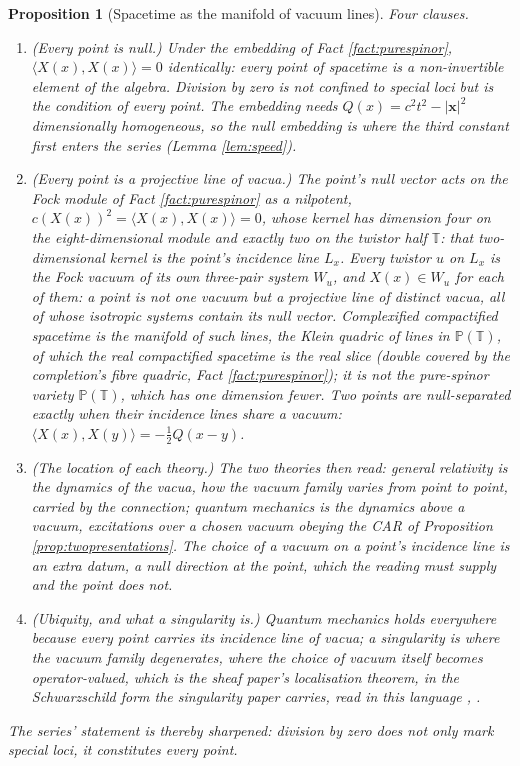 \documentclass[11pt]{article}
\newtheorem{proposition}[theorem]{Proposition}
\theoremstyle{definition}
\newcommand{\T}{\mathbb{T}}
\newcommand{\ip}[2]{\langle #1, #2\rangle}
\begin{document}
\begin{proposition}[Spacetime as the manifold of vacuum lines]\label{prop:vacuummanifold}
Four clauses.
\begin{enumerate}
\item \emph{(Every point is null.)} Under the embedding of Fact \ref{fact:purespinor}, $\ip{X(x)}{X(x)} = 0$ identically: every point of spacetime is a non-invertible element of the algebra. Division by zero is not confined to special loci but is the condition of every point. The embedding needs $Q(x) = c^{2}t^{2} - |\mathbf{x}|^{2}$ dimensionally homogeneous, so the null embedding is where the third constant first enters the series (Lemma \ref{lem:speed}).
\item \emph{(Every point is a projective line of vacua.)} The point's null vector acts on the Fock module of Fact \ref{fact:purespinor} as a nilpotent, $c(X(x))^{2} = \ip{X(x)}{X(x)} = 0$, whose kernel has dimension four on the eight-dimensional module and exactly two on the twistor half $\T$: that two-dimensional kernel is the point's incidence line $L_{x}$. Every twistor $u$ on $L_{x}$ is the Fock vacuum of its own three-pair system $W_{u}$, and $X(x) \in W_{u}$ for each of them: a point is not one vacuum but a projective line of distinct vacua, all of whose isotropic systems contain its null vector. Complexified compactified spacetime is the manifold of such lines, the Klein quadric of lines in $\mathbb{P}(\T)$, of which the real compactified spacetime is the real slice (double covered by the completion's fibre quadric, Fact \ref{fact:purespinor}); it is not the pure-spinor variety $\mathbb{P}(\T)$, which has one dimension fewer. Two points are null-separated exactly when their incidence lines share a vacuum: $\ip{X(x)}{X(y)} = -\tfrac12 Q(x - y)$.
\item \emph{(The location of each theory.)} The two theories then read: general relativity is the dynamics \emph{of} the vacua, how the vacuum family varies from point to point, carried by the connection; quantum mechanics is the dynamics \emph{above} a vacuum, excitations over a chosen vacuum obeying the CAR of Proposition \ref{prop:twopresentations}. The choice of a vacuum on a point's incidence line is an extra datum, a null direction at the point, which the reading must supply and the point does not.
\item \emph{(Ubiquity, and what a singularity is.)} Quantum mechanics holds everywhere because every point carries its incidence line of vacua; a singularity is where the vacuum family degenerates, where the choice of vacuum itself becomes operator-valued, which is the sheaf paper's localisation theorem, in the Schwarzschild form the singularity paper carries, read in this language \cite[Thm.~4.4, Cor.~4.5, Thm.~8.12]{ButlerT4}, \cite[App.~B]{ButlerT5}.
\end{enumerate}
The series' statement is thereby sharpened: division by zero does not only mark special loci, it constitutes every point.
\end{proposition}
\end{document}
